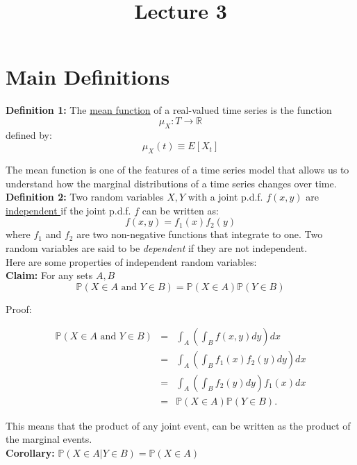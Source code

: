 \documentclass[12] {article}
\begin{document}
\onehalfspace

\title{Lecture 3}
\date{}
\maketitle

\section{Main Definitions}

\textbf{Definition 1:} The \underline{mean function} of a real-valued time series is the function
\[ \mu_{X}: T \rightarrow \mathbb{R} \]
defined by:
\[ \mu_{X}(t) \equiv E[X_t]\]

The mean function is one of the features of a time series model that allows us to understand how the marginal distributions of a time series changes over time.  \\


\noindent \textbf{Definition 2:} Two random variables $X,Y$ with a joint p.d.f. $f(x,y)$ are \underline{independent }if the joint p.d.f. $f$ can be written as:
\[ f(x,y) = f_1(x) f_2(y)  \]  
where $f_1$ and $f_2$ are two non-negative functions that integrate to one. Two random variables are said to be \emph{dependent} if they are not independent. \\

\noindent Here are some properties of independent random variables: \\

\noindent \textbf{Claim:} For any sets $A, B$ 
\[ \mathbb{P} (X \in A \textrm{ and } Y \in B) = \mathbb{P} (X \in A) \mathbb{P} (Y \in B)   \]

\noindent Proof:

\begin{eqnarray*}
\mathbb{P} (X \in A \textrm{ and } Y \in B) &=& \int_{A} \left( \int_{B}  f(x,y) dy \right) dx \\
&= & \int_{A} \left( \int_{B}  f_1(x) f_2(y) dy \right) dx \\
&=&  \int_{A} \left( \int_{B}   f_2(y) dy \right)  f_1 (x) dx \\
&=& \mathbb{P} (X \in A) \mathbb{P} (Y \in B).
\end{eqnarray*}

This means that the product of any joint event, can be written as the product of the marginal events.  \\

\textbf{Corollary:} $\mathbb{P}(X \in A | Y \in B) = \mathbb{P}(X \in A)$ \\
\end{document}
